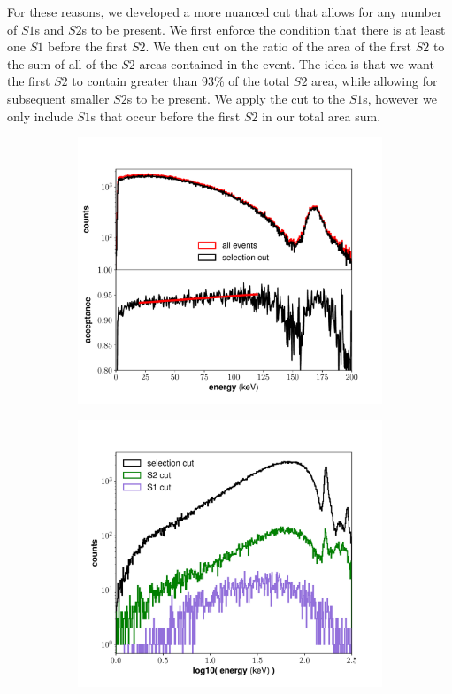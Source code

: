 {For these reasons, we developed a more nuanced cut that allows for any number of $S1$s and $S2$s to be present. We first enforce the condition that there is at least one $S1$ before the first $S2$. We then cut on the ratio of the area of the first $S2$ to the sum of all of the $S2$ areas contained in the event. The idea is that we want the first $S2$ to contain greater than 93\% of the total $S2$ area, while allowing for subsequent smaller $S2$s to be present. We apply the cut to the $S1$s, however we only include $S1$s that occur before the first $S2$ in our total area sum.  
\begin{figure}[h!]
\centering
\begin{subfigure}{0.5\textwidth}
  \centering
  \includegraphics[width=\textwidth]{Figures/DataSelection_singlescatter_new}
\end{subfigure}%
\begin{subfigure}{0.5\textwidth}
  \centering
  \includegraphics[width=\textwidth]{Figures/DataSelection_multiS1S2_new}

\end{subfigure}
\end{figure}}
